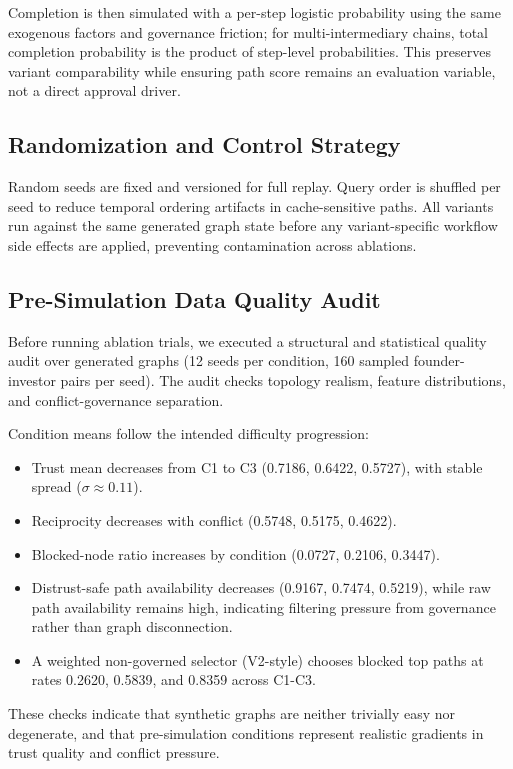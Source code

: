 \documentclass[conference]{IEEEtran}
\begin{document}
Completion is then simulated with a per-step logistic probability using the same exogenous factors and governance friction; for multi-intermediary chains, total completion probability is the product of step-level probabilities. This preserves variant comparability while ensuring path score remains an evaluation variable, not a direct approval driver.

\subsection{Randomization and Control Strategy}
Random seeds are fixed and versioned for full replay. Query order is shuffled per seed to reduce temporal ordering artifacts in cache-sensitive paths. All variants run against the same generated graph state before any variant-specific workflow side effects are applied, preventing contamination across ablations.

\subsection{Pre-Simulation Data Quality Audit}
Before running ablation trials, we executed a structural and statistical quality audit over generated graphs (12 seeds per condition, 160 sampled founder-investor pairs per seed). The audit checks topology realism, feature distributions, and conflict-governance separation.

Condition means follow the intended difficulty progression:
\begin{itemize}
    \item Trust mean decreases from C1 to C3 (0.7186, 0.6422, 0.5727), with stable spread ($\sigma \approx 0.11$).
    \item Reciprocity decreases with conflict (0.5748, 0.5175, 0.4622).
    \item Blocked-node ratio increases by condition (0.0727, 0.2106, 0.3447).
    \item Distrust-safe path availability decreases (0.9167, 0.7474, 0.5219), while raw path availability remains high, indicating filtering pressure from governance rather than graph disconnection.
    \item A weighted non-governed selector (V2-style) chooses blocked top paths at rates 0.2620, 0.5839, and 0.8359 across C1-C3.
\end{itemize}

These checks indicate that synthetic graphs are neither trivially easy nor degenerate, and that pre-simulation conditions represent realistic gradients in trust quality and conflict pressure.
\end{document}
